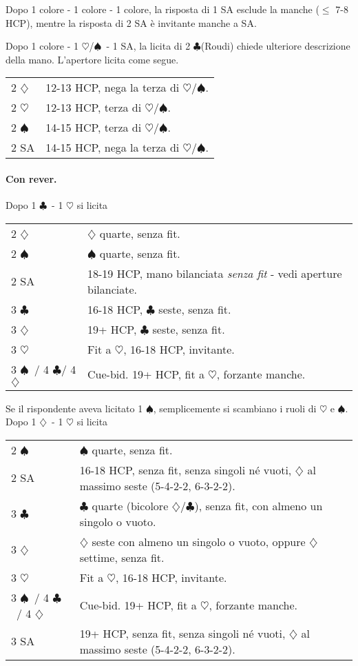 \documentclass[a4paper,10pt]{article}
\renewcommand{\c}{$\clubsuit$\xspace}
\renewcommand{\d}{$\diamondsuit$\xspace}
\newcommand{\h}{$\heartsuit$\xspace}
\newcommand{\s}{$\spadesuit$\xspace}
\newcommand{\sa}{SA\xspace}
\newcommand{\smallspace}{\vskip0.3cm}
\newenvironment{twocol}
  {\smallspace\noindent\begin{tabular}{l p{0.78\textwidth}}}
  {\end{tabular}\smallspace}
\begin{document}
Dopo 1 colore - 1 colore - 1 colore, la risposta di 1 \sa esclude la manche ($\leq$ 7-8 HCP), mentre la risposta di 2 \sa è invitante manche a \sa.

Dopo 1 colore - 1 \h/\s\ - 1 \sa, la licita di 2 \c (Roudi) chiede ulteriore descrizione della mano. L'apertore licita come segue.
\begin{twocol}
  2 \d & 12-13 HCP, nega la terza di \h/\s.\\
  2 \h & 12-13 HCP, terza di \h/\s.\\
  2 \s & 14-15 HCP, terza di \h/\s.\\
  2 \sa & 14-15 HCP, nega la terza di \h/\s.
\end{twocol}


\paragraph{Con rever.} Dopo 1 \c\ - 1 \h si licita
\begin{twocol}
 2 \d & \d quarte, senza fit.\\
 2 \s & \s quarte, senza fit.\\
 2 \sa & 18-19 HCP, mano bilanciata \emph{senza fit} - vedi aperture bilanciate.\\
 3 \c & 16-18 HCP, \c seste, senza fit.\\
 3 \d & 19+ HCP, \c seste, senza fit.\\
 3 \h & Fit a \h, 16-18 HCP, invitante.\\
 3 \s\ / 4 \c / 4 \d & Cue-bid. 19+ HCP, fit a \h, forzante manche.\\
\end{twocol}

\noindent Se il rispondente aveva licitato 1 \s, semplicemente si scambiano i ruoli di \h e \s.
\smallspace
\noindent Dopo 1 \d\ - 1 \h si licita
\begin{twocol}
 2 \s & \s quarte, senza fit.\\
 2 \sa & 16-18 HCP, senza fit, senza singoli né vuoti, \d al massimo seste (5-4-2-2, 6-3-2-2).\\
 3 \c & \c quarte (bicolore \d/\c), senza fit, con almeno un singolo o vuoto.\\
 3 \d & \d seste con almeno un singolo o vuoto, oppure \d settime, senza fit.\\
 3 \h & Fit a \h, 16-18 HCP, invitante.\\
 3 \s\ / 4 \c\ / 4 \d & Cue-bid. 19+ HCP, fit a \h, forzante manche.\\
 3 \sa & 19+ HCP, senza fit, senza singoli né vuoti, \d al massimo seste (5-4-2-2, 6-3-2-2).
\end{twocol}
\end{document}
